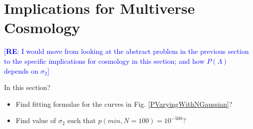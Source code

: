 \documentclass[12pt]{article}
\newcommand{\re}[1]{\textcolor{blue}{[{\bf RE}: #1]}}
\begin{document}



\section{Implications for Multiverse Cosmology}

\re{I would move from looking at the abstract problem in the previous section to the specific implications for cosmology in this section; and how $P(\Lambda)$ depends on $\sigma_2$}

In this section?

\begin{itemize}
\item Find fitting formulae for the curves in Fig. \ref{PVaryingWithNGaussian}?
\item Find value of $\sigma_2$ such that $p(min,N=100) = 10^{-500}$?
\end{itemize}
\end{document}
